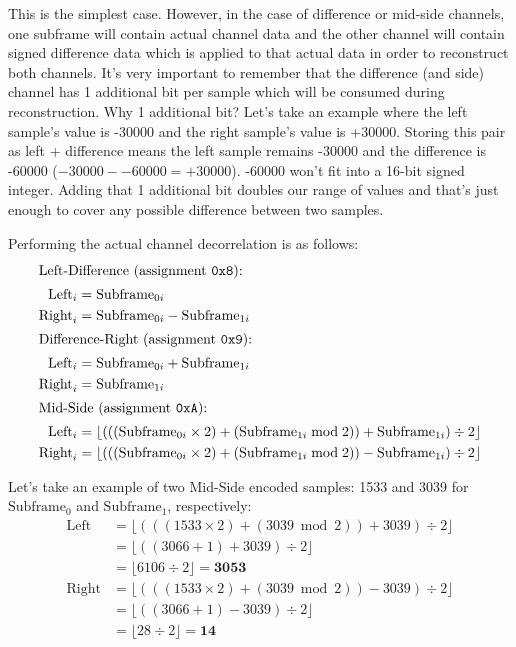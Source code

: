 This is the simplest case.
However, in the case of difference or mid-side channels,
one subframe will contain actual channel data and the other channel
will contain signed difference data which is applied to that actual data
in order to reconstruct both channels.
It's very important to remember that the difference (and side) channel
has 1 additional bit per sample which will be consumed during
reconstruction.
Why 1 additional bit?
Let's take an example where the left sample's value is -30000
and the right sample's value is +30000.
Storing this pair as left + difference means the left
sample remains -30000 and the difference is -60000
($-30000 - -60000 = +30000$).
-60000 won't fit into a 16-bit signed integer.
Adding that 1 additional bit doubles our range of values
and that's just enough to cover any possible difference between
two samples.

Performing the actual channel decorrelation is as follows:
\begin{align*}
\intertext{Left-Difference (assignment \texttt{0x8}):}
\text{Left}_i &= \text{Subframe}_{0i} \\
\text{Right}_i &= \text{Subframe}_{0i} - \text{Subframe}_{1i} \\
\intertext{Difference-Right (assignment \texttt{0x9}):}
\text{Left}_i &= \text{Subframe}_{0i} + \text{Subframe}_{1i} \\
\text{Right}_i &= \text{Subframe}_{1i} \\
\intertext{Mid-Side (assignment \texttt{0xA}):}
\text{Left}_i &= \lfloor (((\text{Subframe}_{0i} \times 2) + (\text{Subframe}_{1i} \bmod{2})) + \text{Subframe}_{1i}) \div 2 \rfloor \\
\text{Right}_i &= \lfloor (((\text{Subframe}_{0i} \times 2) + (\text{Subframe}_{1i} \bmod{2})) - \text{Subframe}_{1i}) \div 2 \rfloor
\end{align*}

\clearpage

Let's take an example of two Mid-Side encoded samples: 1533 and 3039
for $\text{Subframe}_0$ and $\text{Subframe}_1$, respectively:
\begin{align*}
\text{Left} &= \lfloor (((1533 \times 2) + (3039 \bmod{2})) + 3039) \div 2 \rfloor \\
&= \lfloor ((3066 + 1) + 3039) \div 2 \rfloor \\
&= \lfloor 6106 \div 2 \rfloor = \textbf{3053} \\
\text{Right} &= \lfloor (((1533 \times 2) + (3039 \bmod{2})) - 3039) \div 2 \rfloor \\
&= \lfloor ((3066 + 1) - 3039) \div 2 \rfloor \\
&= \lfloor 28 \div 2 \rfloor = \textbf{14}
\end{align*}

